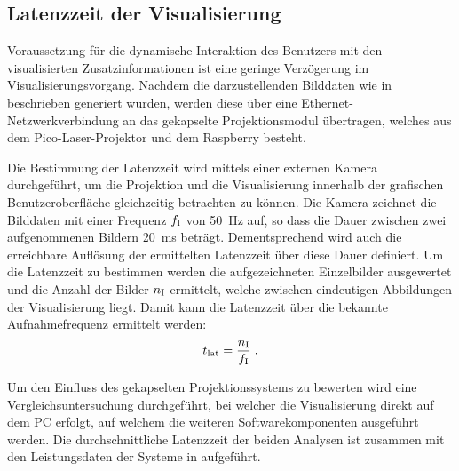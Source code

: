 
%

\subsection{Latenzzeit der Visualisierung}
Voraussetzung für die dynamische Interaktion des Benutzers mit den visualisierten Zusatzinformationen ist eine geringe Verzögerung im Visualisierungsvorgang. Nachdem die darzustellenden Bilddaten wie in  beschrieben generiert wurden, werden diese über eine Ethernet-Netzwerkverbindung an das gekapselte Projektionsmodul übertragen, welches aus dem Pico-Laser-Projektor und dem Raspberry besteht.\\

\prever{
}

Die Bestimmung der Latenzzeit wird mittels einer externen Kamera durchgeführt, um die Projektion und die Visualisierung innerhalb der grafischen Benutzeroberfläche gleichzeitig betrachten zu können. Die Kamera zeichnet die Bilddaten mit einer Frequenz $f_{\mathrm{I}}$ von \SI{50}{\Hz} auf, so dass die Dauer zwischen zwei aufgenommenen Bildern \SI{20}{\milli\second} beträgt. Dementsprechend wird auch die erreichbare Auflösung der ermittelten Latenzzeit über diese Dauer definiert. Um die Latenzzeit zu bestimmen werden die aufgezeichneten Einzelbilder ausgewertet und die Anzahl der Bilder $n_{\mathrm{I}}$ ermittelt, welche zwischen eindeutigen Abbildungen der Visualisierung liegt. Damit kann die Latenzzeit über die bekannte Aufnahmefrequenz ermittelt werden:
%
\begin{equation}
t_{\mathrm{lat}} = \frac{n_{\mathrm{I}}}{f_{\mathrm{I}}} \; \text{.}
\end{equation}


Um den Einfluss des gekapselten Projektionssystems zu bewerten wird eine Vergleichsuntersuchung durchgeführt, bei welcher die Visualisierung direkt auf dem PC erfolgt, auf welchem die weiteren Softwarekomponenten ausgeführt werden. Die durchschnittliche Latenzzeit der beiden Analysen ist zusammen mit den Leistungsdaten der Systeme in  aufgeführt.\\


